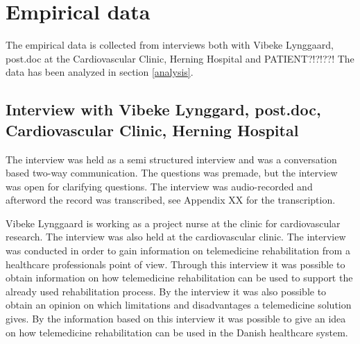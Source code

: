 \chapter{Empirical data}
\label{empirical}


The empirical data is collected from interviews both with Vibeke Lynggaard, post.doc at the Cardiovascular Clinic, Herning Hospital and PATIENT?!?!??! The data has been analyzed in section \ref{analysis}. 


\section{Interview with Vibeke Lynggard, post.doc, Cardiovascular Clinic, Herning Hospital}
The interview was held as a semi structured interview and was a conversation based two-way communication. The questions was premade, but the interview was open for clarifying questions. The interview was audio-recorded and afterword the record was transcribed, see Appendix XX for the transcription.    

Vibeke Lynggaard is working as a project nurse at the clinic for cardiovascular research. The interview was also held at the cardiovascular clinic. The interview was conducted in order to gain information on telemedicine rehabilitation from a healthcare professionals point of view. Through this interview it was possible to obtain information on how telemedicine rehabilitation can be used to support the already used rehabilitation process. By the interview it was also possible to obtain an opinion on which limitations and disadvantages a telemedicine solution gives. By the information based on this interview it was possible to give an idea on how telemedicine rehabilitation can be used in the Danish healthcare system. 

